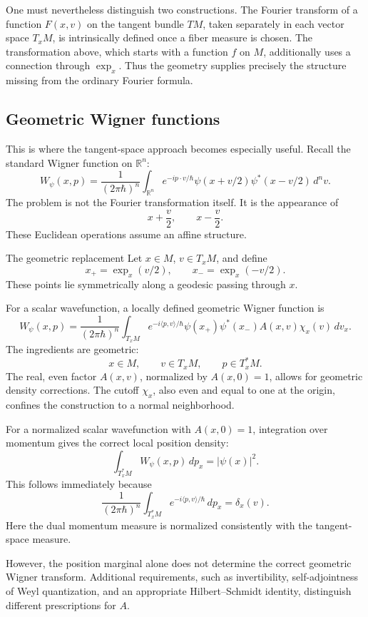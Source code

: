 One must nevertheless distinguish two constructions. The Fourier transform of a
function \(F(x,v)\) on the tangent bundle \(TM\), taken separately in each
vector space \(T_xM\), is intrinsically defined once a fiber measure is chosen.
The transformation above, which starts with a function \(f\) on \(M\),
additionally uses a connection through \(\exp_x\).
Thus the geometry supplies precisely the structure missing from the ordinary
Fourier formula.

\subsection{Geometric Wigner functions}
This is where the tangent-space approach becomes especially useful.
Recall the standard Wigner function on \(\mathbb R^n\):
\[
W_\psi(x,p)
=
\frac{1}{(2\pi\hbar)^n}
\int_{\mathbb R^n}
e^{-ip\cdot v/\hbar}
\psi(x+v/2)\psi^*(x-v/2)\,d^nv.
\]
The problem is not the Fourier transformation itself. It is the appearance of
\[
x+\frac v2,\qquad x-\frac v2.
\]
These Euclidean operations assume an affine structure.

The geometric replacement
Let \(x\in M\), \(v\in T_xM\), and define
\[
x_+=\exp_x(v/2),\qquad
x_-=\exp_x(-v/2).
\]
These points lie symmetrically along a geodesic passing through \(x\).

For a scalar wavefunction, a locally defined geometric Wigner function is
\[
\boxed{
W_\psi(x,p)=
\frac{1}{(2\pi\hbar)^n}
\int_{T_xM}
e^{-i\langle p,v\rangle/\hbar}
\psi(x_+)\psi^*(x_-)
A(x,v)\chi_x(v)\,dv_x.
}
\]
The ingredients are geometric:
\[
x\in M,\qquad
v\in T_xM,\qquad
p\in T_x^*M.
\]
The real, even factor \(A(x,v)\), normalized by \(A(x,0)=1\), allows for
geometric density corrections. The cutoff \(\chi_x\), also even and equal to
one at the origin, confines the construction to a normal neighborhood.

For a normalized scalar wavefunction with \(A(x,0)=1\), integration over
momentum gives the correct local position density:
\[
\int_{T_x^*M}W_\psi(x,p)\,dp_x
=
|\psi(x)|^2.
\]
This follows immediately because
\[
\frac{1}{(2\pi\hbar)^n}
\int_{T_x^*M}
e^{-i\langle p,v\rangle/\hbar}\,dp_x
=
\delta_x(v).
\]
Here the dual momentum measure is normalized consistently with the
tangent-space measure.

However, the position marginal alone does not determine the correct geometric
Wigner transform. Additional requirements, such as invertibility,
self-adjointness of Weyl quantization, and an appropriate Hilbert–Schmidt
identity, distinguish different prescriptions for \(A\).

